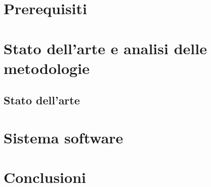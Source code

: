 \documentclass[12pt,a4paper]{report}
\begin{document}
\tableofcontents




\part{Prerequisiti}






% 


\part{Stato dell'arte e analisi delle metodologie}
\chapter{Stato dell'arte}




\part{Sistema software}



% 





\part{Conclusioni}




% 
% 
\end{document}
